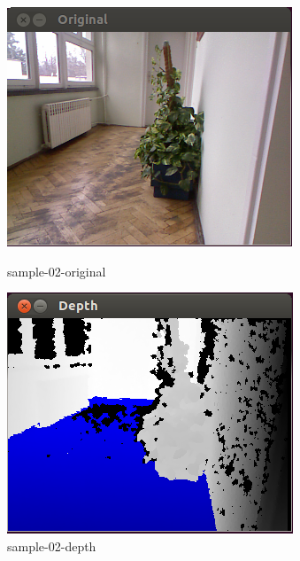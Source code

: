 \begin{figure}
\centering
\begin{minipage}{.5\textwidth}
  \centering
  \includegraphics[width=.9\linewidth]{images/lab6-sample-02-or.png}
  \caption{sample-02-original}
  \label{fig:sample-02-original}
\end{minipage}%
\begin{minipage}{.5\textwidth}
  \centering
  \includegraphics[width=.9\linewidth]{images/lab6-sample-02-dp.png}
  \caption{sample-02-depth}
  \label{fig:sample-02-depth}
\end{minipage}
\end{figure}

